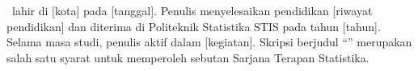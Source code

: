
\noindent\justifying
\skNama\ lahir di [kota] pada [tanggal]. Penulis menyelesaikan pendidikan
[riwayat pendidikan] dan diterima di Politeknik Statistika STIS pada tahun [tahun].
Selama masa studi, penulis aktif dalam [kegiatan]. Skripsi berjudul
``\skJudul'' merupakan salah satu syarat untuk memperoleh sebutan Sarjana Terapan
Statistika.
